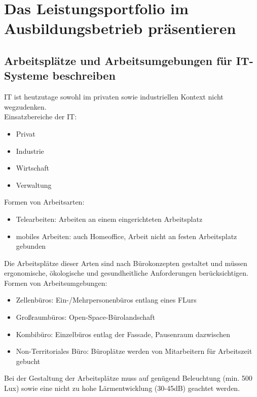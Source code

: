 \section{Das Leistungsportfolio im Ausbildungsbetrieb präsentieren}
\subsection{Arbeitsplätze und Arbeitsumgebungen für IT-Systeme beschreiben}
    \begin{subindent}
        IT ist heutzutage sowohl im privaten sowie industriellen Kontext nicht wegzudenken. \\
        Einsatzbereiche der IT:
    \end{subindent}
    \begin{itemize}[leftmargin=2.5cm, topsep=0.3em, itemsep=0.1em, parsep=0.5em]
        \item Privat
        \item Industrie
        \item Wirtschaft
        \item Verwaltung
    \end{itemize}
    \begin{subindent}
        Formen von Arbeitsarten:
    \end{subindent}
    \begin{itemize}[leftmargin=2.5cm, topsep=0.3em, itemsep=0.1em, parsep=0.5em]
        \item Telearbeiten: Arbeiten an einem eingerichteten Arbeitsplatz
        \item mobiles Arbeiten: auch Homeoffice, Arbeit nicht an festen Arbeitsplatz gebunden
    \end{itemize}
    \begin{subindent}
        Die Arbeitsplätze dieser Arten sind nach Bürokonzepten gestaltet und müssen ergonomische, ökologische und gesundheitliche Anforderungen berücksichtigen. \\
        Formen von Arbeitsumgebungen:
    \end{subindent}
    \begin{itemize}[leftmargin=2.5cm, topsep=0.3em, itemsep=0.1em, parsep=0.5em]
        \item Zellenbüros: Ein-/Mehrpersonenbüros entlang eines FLurs
        \item Großraumbüros: Open-Space-Bürolandschaft
        \item Kombibüro: Einzelbüros entlag der Fassade, Pausenraum dazwischen
        \item Non-Territoriales Büro: Büroplätze werden von Mitarbeitern für Arbeitszeit gebucht
    \end{itemize}
    \begin{subindent}
        Bei der Gestaltung der Arbeitsplätze muss auf genügend Beleuchtung (min. 500 Lux) sowie eine nicht zu hohe Lärmentwicklung (30-45dB) geachtet werden.
    \end{subindent}
